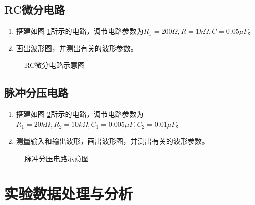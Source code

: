 \documentclass[a4paper,11pt,UTF8]{ctexart}
\begin{document}
  \subsection{RC微分电路}
  \begin{enumerate}
    \item 搭建如图 \ref{fig:RCDev}所示的电路，调节电路参数为$R_1=200\Omega,R=1k\Omega,C=0.05\mu F$。
    \item 画出波形图，并测出有关的波形参数。
  \end{enumerate}
  \begin{figure}[htbp]
    \centering
    \caption{RC微分电路示意图}
    \label{fig:RCDev}
    \end{figure}
  \subsection{脉冲分压电路}
  \begin{enumerate}
    \item 搭建如图 \ref{fig:bleeder}所示的电路，调节电路参数为$R_1=20k\Omega,R_2=10k\Omega,C_1=0.005\mu F,C_2=0.01\mu F$。
    \item 测量输入和输出波形，画出波形图，并测出有关的波形参数。
  \end{enumerate}
  \begin{figure}[htbp]
    \centering
    \caption{脉冲分压电路示意图}
    \label{fig:bleeder}
    \end{figure}

\section{实验数据处理与分析}
\end{document}
